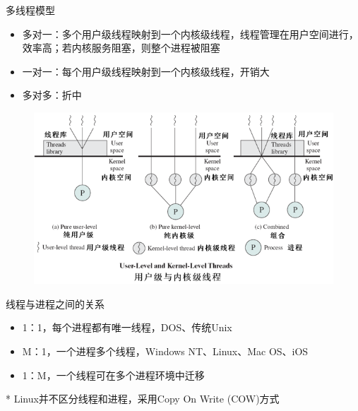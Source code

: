 \bigskip
多线程模型
\begin{itemize}
    \item 多对一：多个用户级线程映射到一个内核级线程，线程管理在用户空间进行，效率高；若内核服务阻塞，则整个进程被阻塞
    \item 一对一：每个用户级线程映射到一个内核级线程，开销大
    \item 多对多：折中
\end{itemize}
\begin{figure}[H]
    \centering
    \includegraphics[width=0.6\linewidth]{fig/threads.png}
\end{figure}

线程与进程之间的关系
\begin{itemize}
    \item 1：1，每个进程都有唯一线程，DOS、传统Unix
    \item M：1，一个进程多个线程，Windows NT、Linux、Mac OS、iOS
    \item 1：M，一个线程可在多个进程环境中迁移
\end{itemize}

* Linux并不区分线程和进程，采用Copy On Write (COW)方式